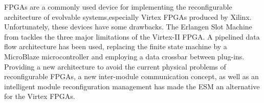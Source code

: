 \label{sec:erlangen}

FPGAs are a commonly used device for implementing the reconfigurable architecture of evolvable systems,especially Virtex FPGAs produced by Xilinx. Unfortunately, these devices have some drawbacks. The Erlangen Slot Machine from \cite{erlangen} tackles the three major limitations of the Virtex-II FPGA. A pipelined data flow architecture has been used, replacing the finite state machine by a MicroBlaze microcontroller and employing a data crossbar between plug-ins. Providing  a new architecture to avoid the current physical problems of reconfigurable FPGAs, a new inter-module communication concept, as well as an intelligent module reconfiguration management has made the ESM an alternative for the Virtex FPGAs.
